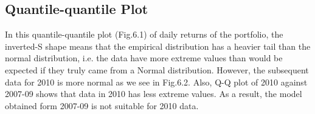 \documentclass[11pt]{article}
\begin{document}
\vspace{-1em}\subsection{Quantile-quantile Plot}\vspace{-1em} 
In this quantile-quantile plot (Fig.6.1) of daily returns of the portfolio, the inverted-S shape means that the empirical distribution has a heavier tail than the normal distribution, i.e. the data have more extreme values than would be expected if they truly came from a Normal distribution. However, the subsequent data for 2010 is more normal as we see in Fig.6.2. Also, Q-Q plot of 2010 against 2007-09 shows that data in 2010 has less extreme values. As a result, the model obtained form 2007-09 is not suitable for 2010 data.
\end{document}

